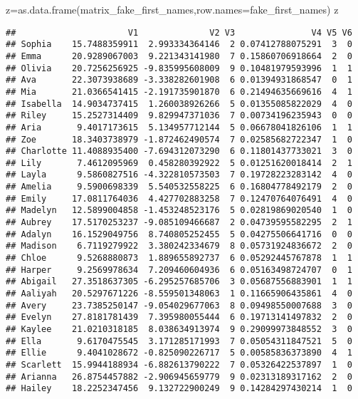 \documentclass[
]{article}
\newenvironment{Shaded}{\begin{snugshade}}{\end{snugshade}}
\newcommand{\AttributeTok}[1]{\textcolor[rgb]{0.77,0.63,0.00}{#1}}
\newcommand{\FunctionTok}[1]{\textcolor[rgb]{0.00,0.00,0.00}{#1}}
\newcommand{\NormalTok}[1]{#1}
\newcommand{\OtherTok}[1]{\textcolor[rgb]{0.56,0.35,0.01}{#1}}
\begin{document}
\begin{Shaded}
\begin{Highlighting}[]
\NormalTok{z}\OtherTok{=}\FunctionTok{as.data.frame}\NormalTok{(matrix\_fake\_first\_names,}\AttributeTok{row.names=}\NormalTok{fake\_first\_names)}
\NormalTok{z}
\end{Highlighting}
\end{Shaded}

\begin{verbatim}
##                      V1              V2 V3               V4 V5 V6
## Sophia    15.7488359911  2.993334364146  2 0.07412788075291  3  0
## Emma      20.9289067003  9.221343141980  7 0.15860706918664  2  0
## Olivia    20.7256256925 -9.835995608009  9 0.10481979593996  1  1
## Ava       22.3073938689 -3.338282601908  6 0.01394931868547  0  1
## Mia       21.0366541415 -2.191735901870  6 0.21494635669616  4  1
## Isabella  14.9034737415  1.260038926266  5 0.01355085822029  4  0
## Riley     15.2527314409  9.829947371036  7 0.00734196235943  0  0
## Aria       9.4017173615  5.134957712144  5 0.06678041826106  1  1
## Zoe       18.3403738979 -1.872462490574  7 0.02585682722347  1  0
## Charlotte 11.4088935400 -7.694312073290  6 0.11801437733021  3  0
## Lily       7.4612095969  0.458280392922  5 0.01251620018414  2  1
## Layla      9.5860827516 -4.322810573503  7 0.19728223283142  4  0
## Amelia     9.5900698339  5.540532558225  6 0.16804778492179  2  0
## Emily     17.0811764036  4.427702883258  7 0.12470764076491  4  0
## Madelyn   12.5899004858 -1.453248523176  5 0.02819869020540  1  0
## Aubrey    17.5170253237 -9.085109466687  2 0.04739595582295  2  1
## Adalyn    16.1529049756  8.740805252455  5 0.04275506641716  0  0
## Madison    6.7119279922  3.380242334679  8 0.05731924836672  2  0
## Chloe      9.5268880873  1.889655892737  6 0.05292445767878  1  1
## Harper     9.2569978634  7.209460604936  6 0.05163498724707  0  1
## Abigail   27.3518637305 -6.295257685706  3 0.05687556883901  1  1
## Aaliyah   20.5297671226 -8.559501348063  1 0.11665906435861  4  0
## Avery     23.7385250147 -9.054029677063  8 0.09498550007688  3  0
## Evelyn    27.8181781439  7.395980055444  6 0.19713141497832  2  0
## Kaylee    21.0210318185  8.038634913974  9 0.29099973848552  3  0
## Ella       9.6170475545  3.171285171993  7 0.05054311847521  5  0
## Ellie      9.4041028672 -0.825090226717  5 0.00585836373890  4  1
## Scarlett  15.9944188934 -6.882613790222  7 0.05326422537897  1  0
## Arianna   26.8754457882 -2.906945659779  9 0.02313189317162  2  0
## Hailey    18.2252347456  9.132722900249  9 0.14284297430214  1  0

\end{verbatim}
\end{document}
